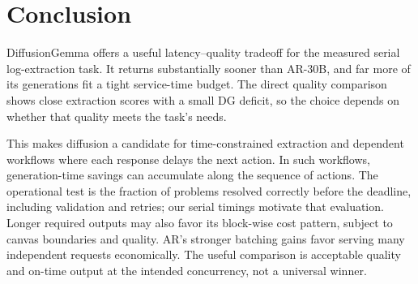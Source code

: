 \section{Conclusion}
\label{sec:conclusion}

DiffusionGemma offers a useful latency--quality tradeoff for the measured
serial log-extraction task. It returns substantially sooner than AR-30B,
and far more of its generations fit a tight service-time budget. The direct
quality comparison shows close extraction scores with a small DG deficit,
so the choice depends on whether that quality meets the task's needs.

This makes diffusion a candidate for time-constrained extraction and
dependent workflows where each response delays the next action. In such
workflows, generation-time savings can accumulate along the sequence of
actions. The operational test is the fraction of problems resolved correctly
before the deadline, including validation and retries; our serial timings
motivate that evaluation. Longer
required outputs may also favor its block-wise cost pattern, subject to
canvas boundaries and quality. AR's stronger batching gains favor serving
many independent requests economically. The useful comparison is acceptable
quality and on-time output at the intended concurrency, not a universal winner.
